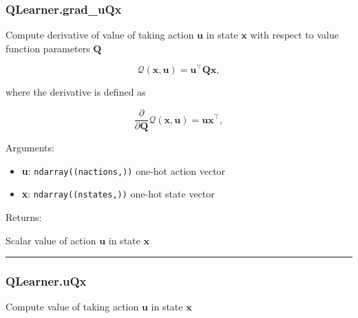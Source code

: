 \subsubsection{QLearner.grad\_uQx}\label{qlearner.grad_uqx}

\begin{Shaded}
\begin{Highlighting}[]
\end{Highlighting}
\end{Shaded}

Compute derivative of value of taking action \(\mathbf u\) in state
\(\mathbf x\) with respect to value function parameters \(\mathbf Q\)

\[
\mathcal Q(\mathbf x, \mathbf u) = \mathbf u^\top \mathbf Q \mathbf x,
\]

where the derivative is defined as

\[
\frac{\partial}{\partial \mathbf Q} \mathcal Q(\mathbf x, \mathbf u) = \mathbf u \mathbf x^\top,
\]

Arguments:

\begin{itemize}
\tightlist
\item
  \textbf{u}: \texttt{ndarray((nactions,))} one-hot action vector
\item
  \textbf{x}: \texttt{ndarray((nstates,))} one-hot state vector
\end{itemize}

Returns:

Scalar value of action \(\mathbf u\) in state \(\mathbf x\)

\begin{center}\rule{0.5\linewidth}{\linethickness}\end{center}

\subsubsection{QLearner.uQx}\label{qlearner.uqx}

\begin{Shaded}
\begin{Highlighting}[]
\end{Highlighting}
\end{Shaded}

Compute value of taking action \(\mathbf u\) in state \(\mathbf x\)

